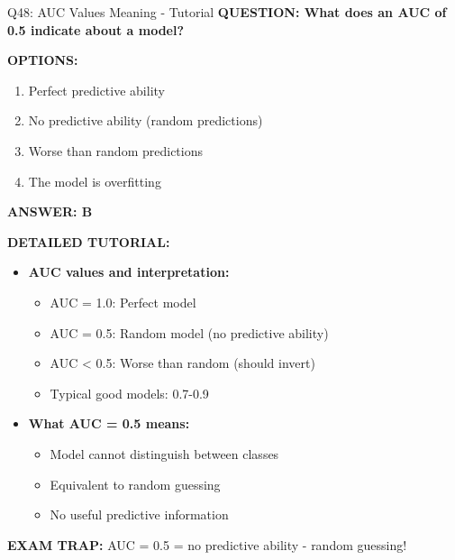 \documentclass[8pt]{beamer}
\begin{document}
	\begin{frame}{Q48: AUC Values Meaning - Tutorial}
		\fontsize{6.5}{7.5}\selectfont
		\textbf{QUESTION: What does an AUC of 0.5 indicate about a model?}
		
		\vspace{0.1cm}
		\textbf{OPTIONS:}
		\begin{enumerate}
			\item Perfect predictive ability
			\item No predictive ability (random predictions)
			\item Worse than random predictions
			\item The model is overfitting
		\end{enumerate}
		
		\vspace{0.1cm}
		\textcolor{myblue}{\textbf{ANSWER: B}}
		
		\vspace{0.1cm}
		\textbf{DETAILED TUTORIAL:}
		\begin{itemize}
			\item \textbf{AUC values and interpretation:}
			\begin{itemize}
				\item AUC = 1.0: Perfect model
				\item AUC = 0.5: Random model (no predictive ability)
				\item AUC < 0.5: Worse than random (should invert)
				\item Typical good models: 0.7-0.9
			\end{itemize}
			\item \textbf{What AUC = 0.5 means:}
			\begin{itemize}
				\item Model cannot distinguish between classes
				\item Equivalent to random guessing
				\item No useful predictive information
			\end{itemize}
		\end{itemize}
		
		\textcolor{myred}{\textbf{EXAM TRAP:}} AUC = 0.5 = \textcolor{myblue}{no predictive ability} - random guessing!
	\end{frame}
	
\end{document}
